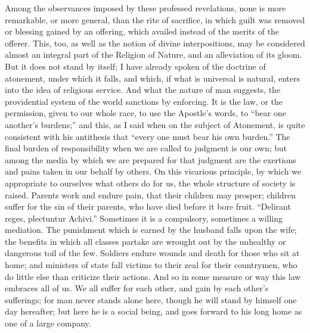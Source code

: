 Among the observances imposed by these professed revelations, none
is more remarkable, or more general, than the rite of sacrifice, in
which guilt was removed or blessing gained by an offering, which
availed instead of the merits of the offerer. This, too, as well as
the notion of divine interpositions, may be considered almost an
integral part of the Religion of Nature, and an alleviation of its
gloom. But it does not stand by itself; I have already spoken of the
doctrine of atonement, under which it falls, and which, if what is
universal is natural, enters into the idea of religious service. And
what the nature of man suggests, the providential system of the world
sanctions by enforcing. It is the law, or the permission, given to our
whole race, to use the Apostle's words, to ``bear one another's
burdens;'' and this, as I said when on the subject of Atonement,
is quite consistent with his antithesis that ``every one must bear
his own burden.'' The final burden of responsibility when we are
called to judgment is our own; but among the media by which we are
prepared for that judgment are the exertions and pains taken in our
behalf by others. On this vicarious principle, by which we appropriate
to ourselves what others do for us, the whole structure of society is
raised. Parents work and endure pain, that their children may prosper;
children suffer for the sin of their parents, who have died before it
bore fruit. ``Delirant reges, plectuntur Achivi.'' Sometimes
it is a compulsory, sometimes a willing mediation. The punishment which is earned by the husband falls upon the wife; the
benefits in which all classes partake are wrought out by the unhealthy
or dangerous toil of the few. Soldiers endure wounds and death for
those who sit at home; and ministers of state fall victims to their
zeal for their countrymen, who do little else than criticize their
actions. And so in some measure or way this law embraces all of us. We
all suffer for each other, and gain by each other's sufferings; for
man never stands alone here, though he will stand by himself one day
hereafter; but here he is a social being, and goes forward to his long
home as one of a large company.

